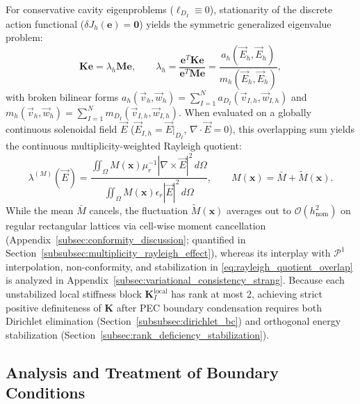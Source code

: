 \documentclass[VANCOUVER]{USG}
\begin{document}
For conservative cavity eigenproblems ($\ell_{D_I} \equiv 0$), stationarity of the discrete action functional ($\delta J_h(\mathbf{e}) = \mathbf{0}$) yields the symmetric generalized eigenvalue problem:
\begin{equation}
    \mathbf{K} \mathbf{e} = \lambda_h \mathbf{M} \mathbf{e}, \qquad \lambda_h = \frac{\mathbf{e}^T \mathbf{K} \mathbf{e}}{\mathbf{e}^T \mathbf{M} \mathbf{e}} = \frac{a_h(\vec{E}_h, \vec{E}_h)}{m_h(\vec{E}_h, \vec{E}_h)},
    \label{eq:rayleigh_quotient_overlap}
\end{equation}
with broken bilinear forms $a_h(\vec{v}_h, \vec{w}_h) = \sum_{I=1}^N a_{D_I}(\vec{v}_{I,h}, \vec{w}_{I,h})$ and $m_h(\vec{v}_h, \vec{w}_h) = \sum_{I=1}^N m_{D_I}(\vec{v}_{I,h}, \vec{w}_{I,h})$. When evaluated on a globally continuous solenoidal field $\vec{E}$ ($\vec{E}_{I,h} = \vec{E}|_{D_I}$, $\nabla \cdot \vec{E} = 0$), this overlapping sum yields the continuous multiplicity-weighted Rayleigh quotient:
\begin{equation}
    \lambda^{(M)}(\vec{E}) = \frac{\iint_{\Omega} M(\mathbf{x}) \mu_r^{-1} |\nabla \times \vec{E}|^2 \, d\Omega}{\iint_{\Omega} M(\mathbf{x}) \epsilon_r |\vec{E}|^2 \, d\Omega}, \qquad M(\mathbf{x}) = \bar{M} + \widetilde{M}(\mathbf{x}).
    \label{eq:multiplicity_rayleigh_quotient}
\end{equation}
While the mean $\bar{M}$ cancels, the fluctuation $\widetilde{M}(\mathbf{x})$ averages out to $\mathcal{O}(h_{\mathrm{nom}}^2)$ on regular rectangular lattices via cell-wise moment cancellation (Appendix~\ref{subsec:conformity_discussion}; quantified in Section~\ref{subsubsec:multiplicity_rayleigh_effect}), whereas its interplay with $\mathcal{P}^1$ interpolation, non-conformity, and stabilization in \eqref{eq:rayleigh_quotient_overlap} is analyzed in Appendix~\ref{subsec:variational_consistency_strang}. Because each unstabilized local stiffness block $\mathbf{K}_I^{\mathrm{local}}$ has rank at most 2, achieving strict positive definiteness of $\mathbf{K}$ after PEC boundary condensation requires both Dirichlet elimination (Section~\ref{subsubsec:dirichlet_bc}) and orthogonal energy stabilization (Section~\ref{subsec:rank_deficiency_stabilization}).

\subsection{Analysis and Treatment of Boundary Conditions}
\label{subsec:boundary_treatment}
\end{document}
